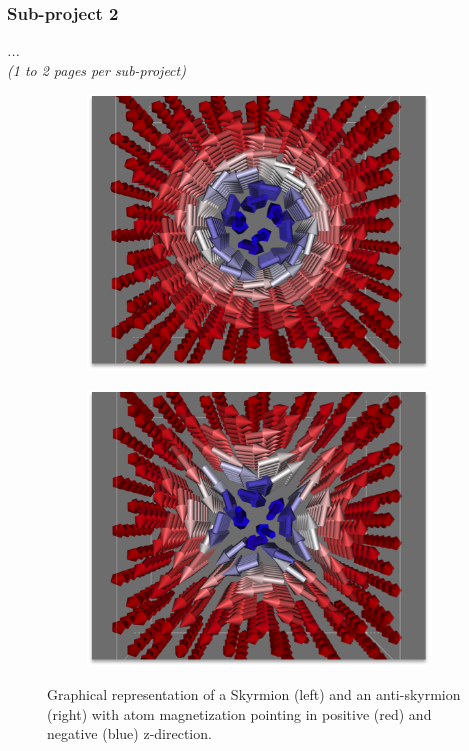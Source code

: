 \documentclass [a4paper, 12pt]{article}
\begin{document}
\subsubsection{Sub-project 2}
\textit{...}\\

\textit{(1 to 2 pages per sub-project)}

\begin{figure}
	\centering
	\begin{subfigure}{.5\textwidth}
		  \centering
		  \includegraphics[width=.99\linewidth]{Figures/MnGe_skyrmion.png}
		  \label{fig:sub1}
	\end{subfigure}%
	\begin{subfigure}{.5\textwidth}
		  \centering
		  \includegraphics[width=.99\linewidth]{Figures/MnGe_antiskyrmion.png}
                  \label{fig:sub2}
	\end{subfigure}
	\caption{Graphical representation of a Skyrmion (left) and an anti-skyrmion (right) 
	with atom magnetization pointing in positive (red) and negative (blue) z-direction.}
	\label{fig:test}
\end{figure}
\end{document}
